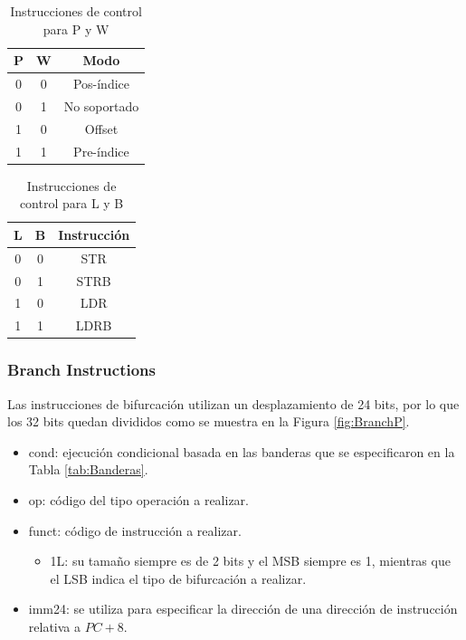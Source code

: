 \documentclass[journal,trans]{IEEEtran}
\begin{document}
	\begin{table}[h]
		\centering
		\begin{tabular}{|c|c|c|}
			\hline
			P & W & Modo \\
			\hline
			\hline
			0 & 0 & Pos-índice \\
			\hline
			0 & 1 & No soportado \\
			\hline
			1 & 0 & Offset \\
			\hline
			1 & 1 & Pre-índice \\
			\hline
		\end{tabular}
		\caption{Instrucciones de control para P y W}
		\label{tab:PW}
	\end{table}
	
	\begin{table}[!htb]
		\centering
		\begin{tabular}{|c|c|c|}
			\hline
			L & B & Instrucción \\
			\hline
			\hline
			0 & 0 & STR \\
			\hline
			0 & 1 & STRB \\
			\hline
			1 & 0 & LDR \\
			\hline
			1 & 1 & LDRB \\
			\hline
		\end{tabular}
		\caption{Instrucciones de control para L y B}
		\label{tab:LB}
	\end{table}

	\subsubsection{Branch Instructions}
	Las instrucciones de bifurcación utilizan un desplazamiento de 24 bits, por lo que los 32 bits quedan divididos como se muestra en la Figura \ref{fig:BranchP}.
	
	\begin{itemize}
		\item cond: ejecución condicional basada en las banderas que se especificaron en la Tabla \ref{tab:Banderas}.
		\item op: código del tipo operación a realizar.
		\item funct: código de instrucción a realizar.
		\begin{itemize}
			\item 1L: su tamaño siempre es de 2 bits y el MSB siempre es 1, mientras que el LSB indica el tipo de bifurcación a realizar.
		\end{itemize}
		\item imm24: se utiliza para especificar la dirección de una dirección de instrucción relativa a $PC + 8$.
	\end{itemize}
	
\end{document}
